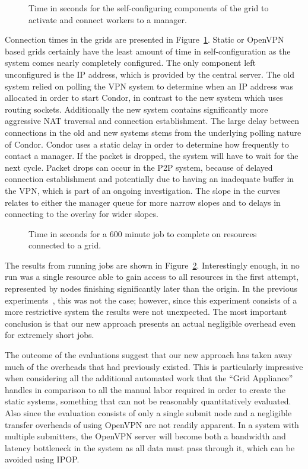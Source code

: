 \documentclass[twocolumn]{svjour3}
\begin{document}
\begin{figure}[ht]
\centering
{}
\caption{Time in seconds for the self-configuring components of the grid to
activate and connect workers to a manager.}
\label{fig:connect}
\end{figure}

Connection times in the grids are presented in Figure~\ref{fig:connect}.
Static or OpenVPN based grids certainly have the least amount of time in
self-configuration as the system comes nearly completely configured.  The only
component left unconfigured is the IP address, which is provided by the central
server.  The old system relied on polling the VPN system to determine when an
IP address was allocated in order to start Condor, in contrast to the new
system which uses routing sockets.  Additionally the new system contains
significantly more aggressive NAT traversal and connection establishment.  The
large delay between connections in the old and new systems stems from the
underlying polling nature of Condor.  Condor uses a static delay in order to
determine how frequently to contact a manager.  If the packet is dropped, the
system will have to wait for the next cycle.  Packet drops can occur in the P2P
system, because of delayed connection establishment and potentially due to
having an inadequate buffer in the VPN, which is part of an ongoing
investigation.  The slope in the curves relates to either the manager queue for
more narrow slopes and to delays in connecting to the overlay for wider slopes.

\begin{figure}[ht]
\centering
{}
\caption{Time in seconds for a 600 minute job to complete on resources
connected to a grid.}
\label{fig:run}
\end{figure}

The results from running jobs are shown in Figure~\ref{fig:run}.  Interestingly
enough, in no run was a single resource able to gain access to all resources in
the first attempt, represented by nodes finishing significantly later than the
origin.  In the previous experiments~\cite{hpdc11}, this was not the case;
however, since this experiment consists of a more restrictive system the
results were not unexpected.   The most important conclusion is that our new
approach presents an actual negligible overhead even for extremely short jobs.

The outcome of the evaluations suggest that our new approach has taken away
much of the overheads that had previously existed.  This is particularly
impressive when considering all the additional automated work that the ``Grid
Appliance'' handles in comparison to all the manual labor required in order to
create the static systems, something that can not be reasonably quantitatively
evaluated.  Also since the evaluation consists of only a single submit node and
a negligible transfer overheads of using OpenVPN are not readily apparent.  In
a system with multiple submitters, the OpenVPN server will become both a
bandwidth and latency bottleneck in the system as all data must pass through
it, which can be avoided using IPOP.
\end{document}
